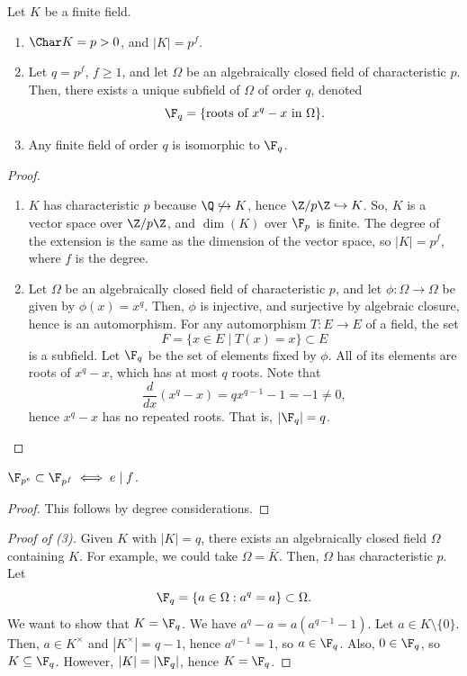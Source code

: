 \begin{thm}
    Let $K$ be a finite field.
    \begin{enumerate}[(1)]
        \item $\Char K = p > 0$, and $|K| = p^f$.
        \item Let $q = p^f$, $f \geq 1$, and let $\Omega$ be an algebraically closed field of characteristic $p$. Then, there exists a unique subfield of $\Omega$ of order $q$, denoted
        $$\F_q = \{\text{roots of } x^q - x \text{ in } \Omega\}.$$
        \item Any finite field of order $q$ is isomorphic to $\F_q$.
    \end{enumerate}
\end{thm}

\begin{proof}
    \hfill
    \begin{enumerate}[(1)]
        \item $K$ has characteristic $p$ because $\Q \not\hookrightarrow K$, hence $\Z/p\Z \hookrightarrow K$. So, $K$ is a vector space over $\Z/p\Z$, and $\dim(K)$ over $\F_p$ is finite. The degree of the extension is the same as the dimension of the vector space, so $|K| = p^f$, where $f$ is the degree.
        \item Let $\Omega$ be an algebraically closed field of characteristic $p$, and let $\phi : \Omega \to \Omega$ be given by $\phi(x) = x^q$. Then, $\phi$ is injective, and surjective by algebraic closure, hence is an automorphism. For any automorphism $T : E \to E$ of a field, the set
        $$F = \{x \in E \mid T(x) = x\} \subset E$$
        is a subfield. Let $\F_q$ be the set of elements fixed by $\phi$. All of its elements are roots of $x^q - x$, which has at most $q$ roots. Note that
        $$\frac{d}{dx}(x^q - x) = qx^{q-1} - 1 = -1 \neq 0,$$
        hence $x^q - x$ has no repeated roots. That is, $|\F_q| = q$.
    \end{enumerate}
\end{proof}

\begin{lem}
    $\F_{p^e} \subset \F_{p^f} \iff e \mid f$.
\end{lem}

\begin{proof}
    This follows by degree considerations.
\end{proof}

\begin{proof}[Proof of (3)]
    Given $K$ with $|K| = q$, there exists an algebraically closed field $\Omega$ containing $K$. For example, we could take $\Omega = \bar K$. Then, $\Omega$ has characteristic $p$. Let
    $$\F_q = \{a \in \Omega : a^q = a\} \subset \Omega.$$
    We want to show that $K = \F_q$. We have $a^q - a = a(a^{q-1} - 1)$. Let $a \in K \setminus \{0\}$. Then, $a \in K^\times$ and $|K^\times| = q - 1$, hence $a^{q-1} = 1$, so $a \in \F_q$. Also, $0 \in \F_q$, so $K \subseteq \F_q$. However, $|K| = |\F_q|$, hence $K = \F_q$.
\end{proof}


